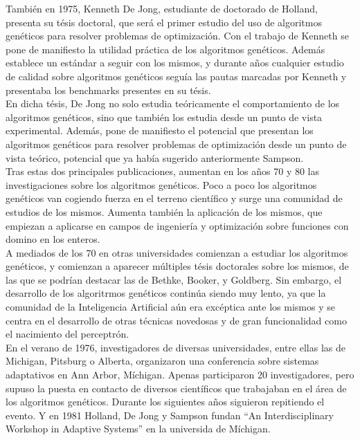 \documentclass[12pt]{article} \usepackage[utf8]{inputenc}
\begin{document}
También en 1975, Kenneth De Jong, estudiante de doctorado de Holland,
presenta su tésis doctoral, que será el primer estudio del uso de
algoritmos genéticos para resolver problemas de optimización. Con el
trabajo de Kenneth se pone de manifiesto la utilidad práctica de los
algoritmos genéticos. Además establece un estándar a seguir con los
mismos, y durante años cualquier estudio de calidad sobre algoritmos
genéticos seguía las pautas marcadas por Kenneth y presentaba
los benchmarks presentes en su tésis.\\

En dicha tésis, De Jong no solo estudia teóricamente el comportamiento
de los algoritmos genéticos, sino que también los estudia desde un
punto de vista experimental. Además, pone de manifiesto el potencial
que presentan los algoritmos genéticos para resolver problemas de
optimización desde un punto de vista teórico,
potencial que ya había sugerido anteriormente Sampson.\\

Tras estas dos principales publicaciones, aumentan en los años 70 y 80
las investigaciones sobre los algoritmos genéticos. Poco a poco los
algoritmos genéticos van cogiendo fuerza en el terreno científico y
surge una comunidad de estudios de los mismos.  Aumenta también la
aplicación de los mismos, que empiezan a aplicarse en campos de
ingeniería y optimización sobre funciones con domino en los enteros.\\

A mediados de los 70 en otras universidades comienzan a estudiar los
algoritmos genéticos, y comienzan a aparecer múltiples tésis
doctorales sobre los mismos, de las que se podrían destacar las de
Bethke, Booker, y Goldberg. Sin embargo, el desarrollo de los
algoritrmos genéticos continúa siendo muy lento, ya que la comunidad
de la Inteligencia Artificial aún era excéptica ante los mismos y se
centra en el desarrollo de otras técnicas novedosas
y de gran funcionalidad como el nacimiento del perceptrón.\\

En el verano de 1976, investigadores de diversas universidades, entre
ellas las de Michigan, Pitsburg o Alberta, organizaron una conferencia
sobre sistemas adaptativos en Ann Arbor, Míchigan. Apenas participaron
20 investigadores, pero supuso la puesta en contacto de diversos
científicos que trabajaban en el área de los algoritmos
genéticos. Durante los siguientes años siguieron repitiendo el
evento. Y en 1981 Holland, De Jong y Sampson fundan ``An
Interdisciplinary Workshop in Adaptive Systems'' en la universida de Míchigan.\\
\end{document}
